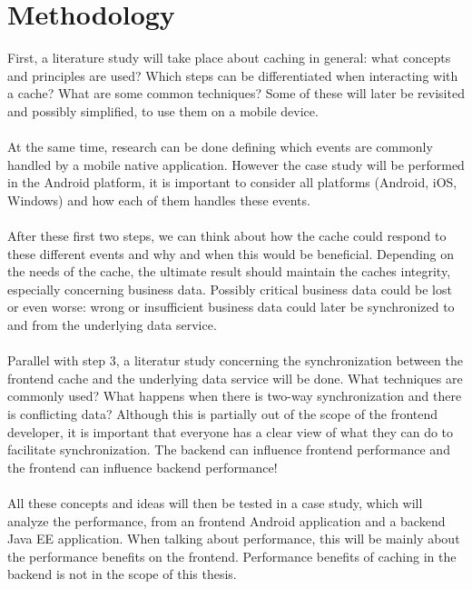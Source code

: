 \documentclass[pdftex,a4paper,12pt,twoside]{report}
\begin{document}
\chapter{Methodology}
\label{ch:methodology}
First, a literature study will take place about caching in general: what concepts and principles are used? Which steps can be differentiated when interacting with a cache? What are some common techniques? Some of these will later be revisited and possibly simplified, to use them on a mobile device.
\\\\
At the same time, research can be done defining which events are commonly handled by a mobile native application. However the case study will be performed in the Android platform, it is important to consider all platforms (Android, iOS, Windows) and how each of them handles these events.
\\\\
After these first two steps, we can think about how the cache could respond to these different events and why and when this would be beneficial. Depending on the needs of the cache, the ultimate result should maintain the caches integrity, especially concerning business data. Possibly critical business data could be lost or even worse: wrong or insufficient business data could later be synchronized to and from the underlying data service.
\\\\
Parallel with step 3, a literatur study concerning the synchronization between the frontend cache and the underlying data service will be done. What techniques are commonly used? What happens when there is two-way synchronization and there is conflicting data? Although this is partially out of the scope of the frontend developer, it is important that everyone has a clear view of what they can do to facilitate synchronization. The backend can influence frontend performance and the frontend can influence backend performance!
\\\\
All these concepts and ideas will then be tested in a case study, which will analyze the performance, from an frontend Android application and a backend Java EE application. 
When talking about performance, this will be mainly about the performance benefits on the frontend. Performance benefits of caching in the backend is not in the scope of this thesis.
\end{document}
